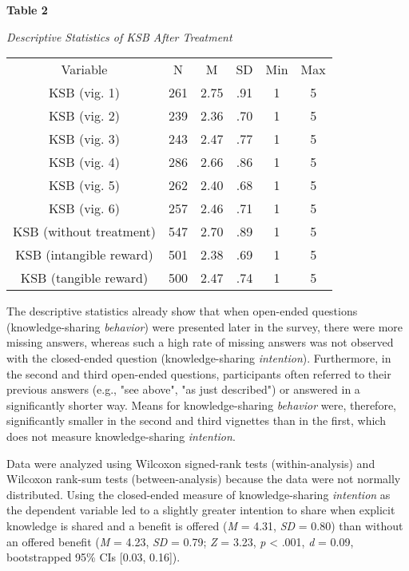 \documentclass{article}
\begin{document}
\textbf{}

\textbf{Table 2}

\emph{Descriptive Statistics of KSB After Treatment}


\begin{table}

  
\begin{tabular}{c  c  c  c  c  c}

  Variable & N & M & SD & Min & Max\\
KSB (vig. 1) & 261 & 2.75 & .91 & 1 & 5\\
KSB (vig. 2) & 239 & 2.36 & .70 & 1 & 5\\
KSB (vig. 3) & 243 & 2.47 & .77 & 1 & 5\\
KSB (vig. 4) & 286 & 2.66 & .86 & 1 & 5\\
KSB (vig. 5) & 262 & 2.40 & .68 & 1 & 5\\
KSB (vig. 6) & 257 & 2.46 & .71 & 1 & 5\\
KSB (without treatment) & 547 & 2.70 & .89 & 1 & 5\\
KSB (intangible reward) & 501 & 2.38 & .69 & 1 & 5\\
KSB (tangible reward) & 500 & 2.47 & .74 & 1 & 5\\


\end{tabular}


\end{table}


The descriptive statistics already show that when open-ended questions (knowledge-sharing \emph{behavior}) were presented later in the survey, there were more missing answers, whereas such a high rate of missing answers was not observed with the closed-ended question (knowledge-sharing \emph{intention}). Furthermore, in the second and third open-ended questions, participants often referred to their previous answers (e.g., "see above", "as just described") or answered in a significantly shorter way. Means for knowledge-sharing \emph{behavior} were, therefore, significantly smaller in the second and third vignettes than in the first, which does not measure knowledge-sharing \emph{intention}.

Data were analyzed using Wilcoxon signed-rank tests (within-analysis) and Wilcoxon rank-sum tests (between-analysis) because the data were not normally distributed. Using the closed-ended measure of knowledge-sharing \emph{intention} as the dependent variable led to a slightly greater intention to share when explicit knowledge is shared and a benefit is offered (\emph{M} = 4.31, \emph{SD} = 0.80) than without an offered benefit (\emph{M} = 4.23, \emph{SD} = 0.79; \emph{Z }= 3.23, \emph{p} < .001, \emph{d} = 0.09, bootstrapped 95\% CIs [0.03, 0.16]).
\end{document}
